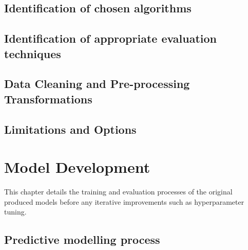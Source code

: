 \documentclass[12pt]{report}
\begin{document}
\section{Identification of chosen algorithms}


\section{Identification of appropriate evaluation techniques}

\section{Data Cleaning and Pre-processing Transformations}

\section{Limitations and Options}


\chapter{Model Development} %
This chapter details the training and evaluation processes of the original produced models
before any iterative improvements such as hyperparameter tuning.

\section{Predictive modelling process}
\end{document}
